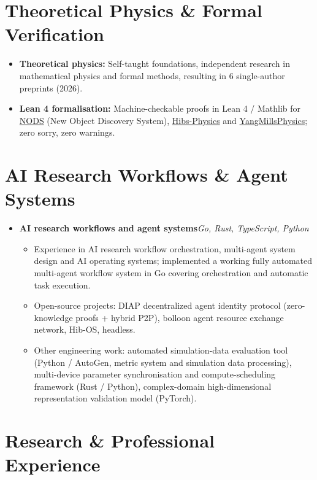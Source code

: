 \documentclass[10pt,a4paper]{article}
\newcommand{\resumeItem}[1]{\item \small #1}
\begin{document}
\section{Theoretical Physics \& Formal Verification}

\begin{itemize}[leftmargin=0.15in, topsep=2pt]
\resumeItem{\textbf{Theoretical physics:} Self-taught foundations, independent research in mathematical physics and formal methods, resulting in 6 single-author preprints (2026).}
\resumeItem{\textbf{Lean 4 formalisation:} Machine-checkable proofs in Lean 4 / Mathlib for \href{https://github.com/logos-42/NODS}{NODS} (New Object Discovery System), \href{https://github.com/logos-42/Hibs-Physics}{Hibs-Physics} and \href{https://github.com/logos-42/YangMillsPhysics}{YangMillsPhysics}; zero sorry, zero warnings.}
\end{itemize}

\section{AI Research Workflows \& Agent Systems}

\begin{itemize}[leftmargin=0.15in, label={}, topsep=2pt]
\item \textbf{AI research workflows and agent systems}\hfill\textit{\small Go, Rust, TypeScript, Python}
\begin{itemize}[topsep=1pt, label=\textbullet]
\resumeItem{Experience in AI research workflow orchestration, multi-agent system design and AI operating systems; implemented a working fully automated multi-agent workflow system in Go covering orchestration and automatic task execution.}
\resumeItem{Open-source projects: DIAP decentralized agent identity protocol (zero-knowledge proofs + hybrid P2P), bolloon agent resource exchange network, Hib-OS, headless.}
\resumeItem{Other engineering work: automated simulation-data evaluation tool (Python / AutoGen, metric system and simulation data processing), multi-device parameter synchronisation and compute-scheduling framework (Rust / Python), complex-domain high-dimensional representation validation model (PyTorch).}
\end{itemize}
\end{itemize}

\section{Research \& Professional Experience}
\end{document}
